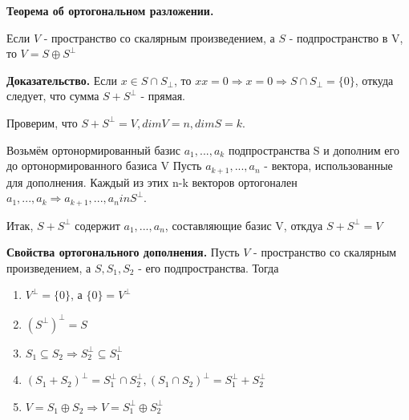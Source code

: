 \documentclass[a4paper]{article}
\begin{document}
    \newpage \begin{center}
                 \begin{Large}
                 \end{Large}
    \end{center}

    \begin{htheorem}
        \textbf{Теорема об ортогональном разложении.}

        Если $V$ - пространство со скалярным произведением, а $S$ - подпространство в V, то $V = S \oplus S^{\bot}$
    \end{htheorem}

    \begin{hproof}
        \textbf{Доказательство.} Если $x \in S \cap S_{\bot}$, то $xx=0 \Rightarrow x=0 \Rightarrow S \cap S_{\bot} = \{ 0 \}$, откуда следует, что сумма $S + S^{\bot}$ - прямая.

        Проверим, что $S + S^{\bot} = V, dimV = n, dimS = k$.

        Возьмём ортонормированный базис $a_1, ..., a_k$ подпространства S и дополним его до ортонормированного базиса V Пусть $a_{k+1}, ..., a_n$ - вектора, использованные для дополнения. Каждый из этих n-k векторов ортогонален $a_1, ..., a_k \Rightarrow a_{k+1}, ..., a_n in S^{\bot}$.

        Итак,  $S + S^{\bot}$ содержит $a_1, ..., a_n$, составляющие базис V,  откдуа $S + S^{\bot} = V$
    \end{hproof}


    \begin{htheorem}
        \textbf{Свойства ортогонального дополнения.} Пусть $V$ - пространство со скалярным произведением, а $S, S_1, S_2$ - его подпространства. Тогда
        \begin{enumerate}
            \item $V^{\bot} = \{ 0 \}$, а $\{ 0 \} = V^{\bot}$
            \item $(S^{\bot})^{\bot} = S$
            \item $S_1 \subseteq S_2 \Rightarrow S_2^{\bot} \subseteq S_1^{\bot}$
            \item $(S_1+S_2)^{\bot} = S_1^{\bot} \cap S_2^{\bot}, (S_1 \cap S_2)^{\bot} = S_1^{\bot} + S_2^{\bot}$
            \item $V = S_1 \oplus S_2 \Rightarrow V = S_1^{\bot} \oplus S_2^{\bot}$
        \end{enumerate}
    \end{htheorem}
\end{document}
